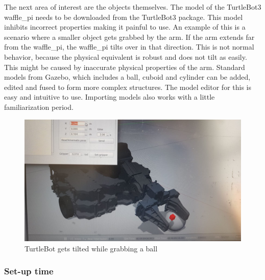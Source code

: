 \documentclass[plainarticle,zihtitle,english,final,hyperref,utf8]{zihpub}
\begin{document}
The next area of interest are the objects themselves. The model of the TurtleBot3 waffle\_pi needs to be downloaded from the TurtleBot3 package. This model inhibits incorrect properties making it painful to use. An example of this is a scenario where a smaller object gets grabbed by the arm. If the arm extends far from the waffle\_pi, the waffle\_pi tilts over in that direction. This is not normal behavior, because the physical equivalent is robust and does not tilt as easily. This might be caused by inaccurate physical properties of the arm. Standard models from Gazebo, which includes a ball, cuboid and cylinder can be added, edited and fused to form more complex structures. The model editor for this is easy and intuitive to use. Importing models also works with a little familiarization period. 
\newline
\begin{figure}[h!]
  \begin{center}
    \includegraphics[width=.75\textwidth]{GazeboSim2.jpeg}
    \caption{TurtleBot gets tilted while grabbing a ball}
    \label{fig:gaztilt}
  \end{center}
\end{figure}

\subsubsection{Set-up time}
\end{document}
